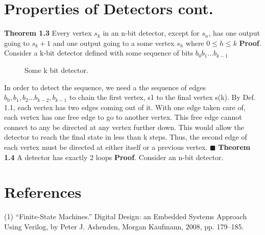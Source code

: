 \documentclass[12pt]{article}
\begin{document}
\section[20pt]{Properties of Detectors cont.}
\textbf{Theorem 1.3} Every vertex \(s_k\) in an n-bit detector, except for \(s_n\), has one output going to \(s_k+1\) and one output going to a some vertex \(s_h\) where \(0\leq h\leq k\)\newline
\textbf{Proof}. Consider a k-bit detector defined with some sequence of bits \(b_0b_1...b_{k-1}\)
\newline
\begin{figure}[ht]
	\centering
	\caption{Some k bit detector.}
\end{figure}
\newline
In order to detect the sequence, we need a the sequence of edges \(b_0,b_1,b_2...b_{k-2},b_{k-1}\) to chain the first vertex, s1 to the final vertex s(k). \newline
By Def. 1.1, each vertex has two edges coming out of it. With one edge taken care of, each vertex has one free edge to go to another vertex. \newline
This free edge cannot connect to any be directed at any vertex further down. This would allow the detector to reach the final state in less than k steps. Thus, the second edge of each vertex must be directed at either itself or a previous vertex. \newline
\(\blacksquare\) \newline
\newline
\textbf{Theorem 1.4} A detector has exactly 2 loops \newline
\textbf{Proof}. Consider an n-bit detector. \newline

\newpage
\section[20pt]{References}
(1) “Finite-State Machines.” Digital Design: an Embedded Systems Approach Using Verilog, by Peter J. Ashenden, Morgan Kaufmann, 2008, pp. 179–185.
\end{document}
